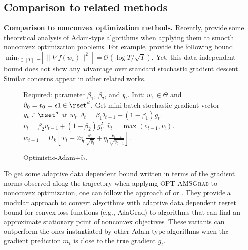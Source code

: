 \documentclass[wcp]{jmlr}
\begin{document}
\subsection{Comparison to related methods} \label{sec:related}


\textbf{Comparison to nonconvex optimization methods.}\hspace{0.1in}
Recently, \citep{ZRSKK18,CLSH19,WWB18,ZTYCG18,ZS18,LO18} provide some theoretical analysis of Adam-type algorithms when applying them to smooth nonconvex optimization problems. 
For example, \citep{CLSH19} provide the following bound $\min_{t \in [T]} \mathbb{E}[\| \nabla f(w_t) \|^2 ] = \mathcal{O}(\log T / \sqrt{T}) $.
Yet, this data independent bound does not show any advantage over standard stochastic gradient descent. 
Similar concerns appear in other related works.

\begin{figure}\vspace{-0.9cm}
\begin{minipage}{\linewidth}
\begin{algorithm}[H]
\begin{algorithmic}[1]
\caption{Optimistic-Adam+$\hat{v}_t$. \label{OPT-DISZ}}
\STATE Required: parameter $\beta_1$, $\beta_2$, and $\eta_t$.
\STATE Init: $w_1 \in \Theta$ and $\hat{v}_0 = v_{0} = \epsilon 1 \in \rset^{d}$.
\STATE Get mini-batch stochastic gradient vector $g_t \in \rset^d$ at $w_t$.
\STATE $\theta_t = \beta_{1} \theta_{t-1} + (1 - \beta_{1}) g_t$.
\STATE $v_t = \beta_2 v_{t-1} + (1 - \beta_2) g_t^2$.
\STATE $\hat{v}_t = \max( \hat{v}_{t-1} , v_t )$.
\STATE $w_{t+1} = \Pi_{k}[ w_{t} - 2 \eta_t \frac{\theta_t}{ \sqrt{\hat{v}_t }}
+ \eta_t \frac{\theta_{t-1}}{ \sqrt{\hat{v}_{t-1}} }]$.
\ENDFOR
\end{algorithmic}
\end{algorithm}
\vspace{-0.1in}
\end{minipage}\end{figure}
To get some adaptive data dependent bound written in terms of the gradient norms observed along the trajectory when applying  \textsc{OPT-AMSGrad} to nonconvex optimization, one can follow the approach of \citep{Princeton18} or \citep{CYYZC19}.
They provide a modular approach to convert algorithms with adaptive data dependent regret bound for convex loss functions (e.g., AdaGrad) to algorithms that can find an approximate stationary point of nonconvex objectives. 
These variants can outperform the ones instantiated by other Adam-type algorithms when the gradient prediction $m_t$ is close to the true gradient $g_t$.
\end{document}
